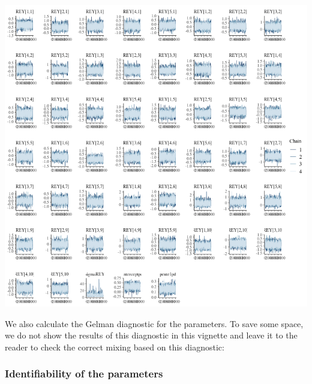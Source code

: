 \documentclass[a4paper]{article}
\newenvironment{Default Paragraph Font}{}{}
\begin{document}
\begin{knitrout}
\color{fgcolor}\begin{kframe}
\begin{alltt}
           \hlstd{=}\hlstd{(}\hlstd{,}\hlstd{,}\hlstd{,}\hlstd{))}
\end{alltt}
\end{kframe}

{\centering \includegraphics[width=\linewidth,height=\linewidth]{caperpy-traceplot-detection-1} 

}



\end{knitrout}

We also calculate the Gelman diagnostic for the parameters. To save
some space, we do not show the results of this diagnostic in this
vignette and leave it to the reader to check the correct mixing based
on this diagnostic:

\begin{knitrout}
\color{fgcolor}\begin{kframe}
\begin{alltt}
\end{alltt}
\end{kframe}
\end{knitrout}

\subsubsection{Identifiability of the parameters}
\label{sec:ident-param}
\end{document}
